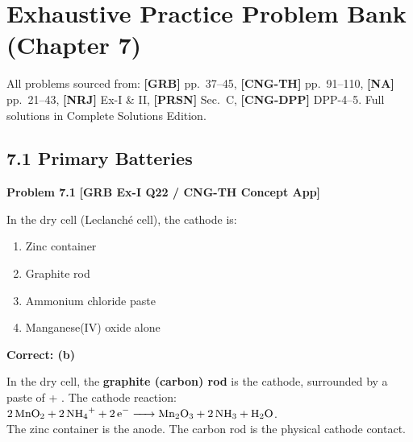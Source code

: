 \newpage
\section{Exhaustive Practice Problem Bank (Chapter 7)}
\label{sec:ch07_problem_bank}

\begin{tcolorbox}[enhanced,colback=subtlegreen,colframe=cengagegreen,arc=2mm,boxrule=1pt,
    title=\textbf{\large Chapter 7 Problem Bank}]
All problems sourced from: \textbf{[GRB]} pp.~37--45, \textbf{[CNG-TH]} pp.~91--110, \textbf{[NA]} pp.~21--43, \textbf{[NRJ]} Ex-I \& II, \textbf{[PRSN]} Sec.~C, \textbf{[CNG-DPP]} DPP-4--5. Full solutions in Complete Solutions Edition.
\end{tcolorbox}

\subsection{7.1 Primary Batteries}

\begin{problembox}
\textbf{Problem 7.1} \hfill \textbf{[GRB Ex-I Q22 / CNG-TH Concept App]}

In the dry cell (Leclanch\'{e} cell), the cathode is:
\begin{enumerate}[label=(\alph*)]
    \item Zinc container
    \item Graphite rod
    \item Ammonium chloride paste
    \item Manganese(IV) oxide alone
\end{enumerate}
\end{problembox}
\begin{solution}
\textbf{Correct: (b)}

In the dry cell, the \textbf{graphite (carbon) rod} is the cathode, surrounded by a paste of  + . The cathode reaction: $\ce{2MnO2 + 2NH4+ + 2e- -> Mn2O3 + 2NH3 + H2O}$.\\
The zinc container is the anode. The carbon rod is the physical cathode contact.
\end{solution}

